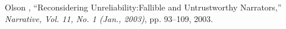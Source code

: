 \begin{thebibliography}{3}
Olson , ``Reconsidering Unreliability:Fallible and Untrustworthy Narrators,'' \emph{Narrative, Vol. 11, No. 1 (Jan., 2003)}, pp. 93--109, 2003.
\end{thebibliography}
